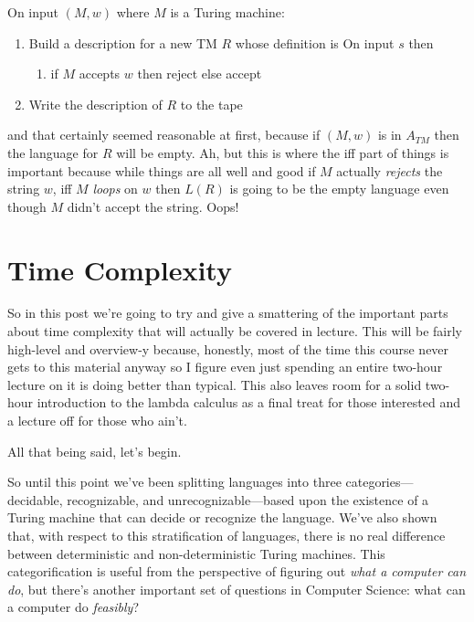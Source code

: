 \documentclass[11pt]{article}
\begin{document}
On input $(M,w)$ where $M$ is a Turing machine: 
\begin{enumerate}
\item Build a description for a new TM $R$ whose definition is
On input $s$ then 
\begin{enumerate}
\item if $M$ accepts $w$ then reject else accept
\end{enumerate}
\item Write the description of $R$ to the tape
\end{enumerate}

and that certainly seemed reasonable at first, because if $(M,w)$ is in $A_{TM}$ then the language for $R$ will be empty. Ah, but this is where the iff part of things is important because while things are all well and good if $M$ actually \emph{rejects} the string $w$, iff $M$ \emph{loops} on $w$ then $L(R)$ is going to be the empty language even though $M$ didn't accept the string. Oops! 
\section{Time Complexity}
\label{sec-17}
So in this post we're going to try and give a smattering of the important parts about time complexity that will actually be covered in lecture. This will be fairly high-level and overview-y because, honestly, most of the time this course never gets to this material anyway so I figure even just spending an entire two-hour lecture on it is doing better than typical. This also leaves room for a solid two-hour introduction to the lambda calculus as a final treat for those interested and a lecture off for those who ain't.

All that being said, let's begin.

So until this point we've been splitting languages into three categories--- decidable, recognizable, and unrecognizable---based upon the existence of a Turing machine that can decide or recognize the language. We've also shown that, with respect to this stratification of languages, there is no real difference between deterministic and non-deterministic Turing machines. This categorification is useful from the perspective of figuring out \emph{what a computer can do}, but there's another important set of questions in Computer Science: what can a computer do \emph{feasibly}? 
\end{document}
